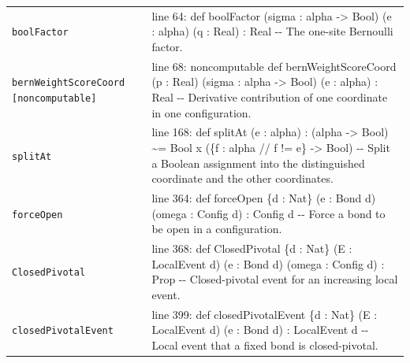 \documentclass[10pt]{article}
\begin{document}
\begin{longtable}{>{\raggedright\arraybackslash}p{} >{\raggedright\arraybackslash}p{}}
\texttt{boolFactor} & {\ttfamily\scriptsize line 64:\allowbreak{} def boolFactor (\allowbreak{}sigma :\allowbreak{} alpha -\allowbreak{}> Bool)\allowbreak{} (\allowbreak{}e :\allowbreak{} alpha)\allowbreak{} (\allowbreak{}q :\allowbreak{} Real)\allowbreak{} :\allowbreak{} Real -\allowbreak{}-\allowbreak{} The one-\allowbreak{}site Bernoulli factor.\allowbreak{}} \\[0.45em]
\texttt{bernWeightScoreCoord [noncomputable]} & {\ttfamily\scriptsize line 68:\allowbreak{} noncomputable def bernWeightScoreCoord (\allowbreak{}p :\allowbreak{} Real)\allowbreak{} (\allowbreak{}sigma :\allowbreak{} alpha -\allowbreak{}> Bool)\allowbreak{} (\allowbreak{}e :\allowbreak{} alpha)\allowbreak{} :\allowbreak{} Real -\allowbreak{}-\allowbreak{} Derivative contribution of one coordinate in one configuration.\allowbreak{}} \\[0.45em]
\texttt{splitAt} & {\ttfamily\scriptsize line 168:\allowbreak{} def splitAt (\allowbreak{}e :\allowbreak{} alpha)\allowbreak{} :\allowbreak{} (\allowbreak{}alpha -\allowbreak{}> Bool)\allowbreak{} \textasciitilde{}=\allowbreak{} Bool x (\allowbreak{}\{f :\allowbreak{} alpha /\allowbreak{}/\allowbreak{} f !=\allowbreak{} e\} -\allowbreak{}> Bool)\allowbreak{} -\allowbreak{}-\allowbreak{} Split a Boolean assignment into the distinguished coordinate and the other coordinates.\allowbreak{}} \\[0.45em]
\texttt{forceOpen} & {\ttfamily\scriptsize line 364:\allowbreak{} def forceOpen \{d :\allowbreak{} Nat\} (\allowbreak{}e :\allowbreak{} Bond d)\allowbreak{} (\allowbreak{}omega :\allowbreak{} Config d)\allowbreak{} :\allowbreak{} Config d -\allowbreak{}-\allowbreak{} Force a bond to be open in a configuration.\allowbreak{}} \\[0.45em]
\texttt{ClosedPivotal} & {\ttfamily\scriptsize line 368:\allowbreak{} def ClosedPivotal \{d :\allowbreak{} Nat\} (\allowbreak{}E :\allowbreak{} LocalEvent d)\allowbreak{} (\allowbreak{}e :\allowbreak{} Bond d)\allowbreak{} (\allowbreak{}omega :\allowbreak{} Config d)\allowbreak{} :\allowbreak{} Prop -\allowbreak{}-\allowbreak{} Closed-\allowbreak{}pivotal event for an increasing local event.\allowbreak{}} \\[0.45em]
\texttt{closedPivotalEvent} & {\ttfamily\scriptsize line 399:\allowbreak{} def closedPivotalEvent \{d :\allowbreak{} Nat\} (\allowbreak{}E :\allowbreak{} LocalEvent d)\allowbreak{} (\allowbreak{}e :\allowbreak{} Bond d)\allowbreak{} :\allowbreak{} LocalEvent d -\allowbreak{}-\allowbreak{} Local event that a fixed bond is closed-\allowbreak{}pivotal.\allowbreak{}} \\[0.45em]
\end{longtable}
\end{document}
